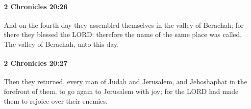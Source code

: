 		\paragraph{2 Chronicles 20:26} %
			\label{2CHRONICLES-20-26}

			And on the fourth day they assembled themselves in the valley of Berachah; for there they blessed the LORD: therefore the name of the same place was called, The valley of Berachah, unto this day.


		\paragraph{2 Chronicles 20:27} %
			\label{2CHRONICLES-20-27}

			Then they returned, every man of Judah and Jerusalem, and Jehoshaphat in the forefront of them, to go again to Jerusalem with joy; for the LORD had made them to rejoice over their enemies.

